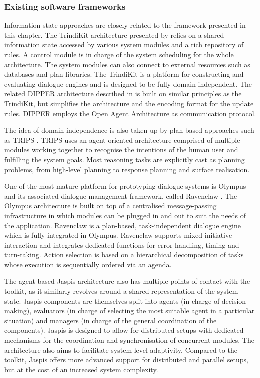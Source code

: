 \subsubsection*{Existing software frameworks}

Information state approaches are closely related to the framework presented in this chapter. The TrindiKit architecture presented by \cite{Larsson:2000} relies on a shared information state accessed by various system modules and a rich repository of rules. A control module is in charge of the system scheduling for the whole architecture. The system modules can also connect to external resources such as databases and plan libraries.   The TrindiKit is a platform for constructing and evaluating dialogue engines and is designed to be fully domain-independent. The related DIPPER architecture described in \cite{Bos2003} is built on similar principles as the TrindiKit, but simplifies the architecture and the encoding format for the  update rules.  DIPPER employs the Open Agent Architecture as communication protocol.

The idea of domain independence is also taken up by plan-based approaches such as TRIPS \citep[The Rochester Interactive Planning System, cf. ][]{Allen:2000:AGD:973935.973937}. TRIPS uses an agent-oriented architecture comprised of multiple modules working together to recognise the intentions of the human user and fulfilling the system goals.  Most reasoning tasks are explicitly cast as planning problems, from high-level planning to response planning and surface realisation.  

One of the most mature platform for prototyping dialogue systems is Olympus and its associated dialogue management framework, called Ravenclaw \citep{Bohus:2007,Bohus:2009}.  The Olympus architecture is built on top of a centralised message-passing infrastructure in which modules can be plugged in and out to suit the needs of the application.  Ravenclaw is a plan-based, task-independent dialogue engine which is fully integrated in Olympus.  Ravenclaw supports mixed-initiative interaction and integrates dedicated functions for error handling, timing and turn-taking. Action selection is based on a hierarchical decomposition of tasks whose execution is sequentially ordered via an agenda. 

The agent-based Jaspis architecture \citep{jaspis2004} also has multiple points of contact with the \opendial{} toolkit, as it similarly revolves around a shared representation of the system state.  Jaspis components are themselves split into agents (in charge of decision-making), evaluators (in charge of selecting the most suitable agent in a particular situation) and managers (in charge of the general coordination of the components). Jaspis is designed to allow for distributed setups with dedicated mechanisms for the coordination and synchronisation of concurrent modules.  The architecture also aims to facilitate system-level adaptivity.  Compared to the \opendial{} toolkit, Jaspis offers more advanced support for distributed and parallel setups, but at the cost of an increased system complexity.  

